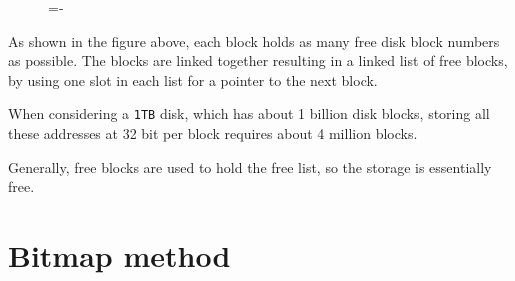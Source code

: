 \documentclass[a4paper]{systems-software}
\begin{document}
\begin{figure}[H]
  \lineskip=-\fboxrule
\end{figure}

As shown in the figure above, each block holds as many free disk block numbers as possible. The blocks are linked together resulting in a linked list of free blocks, by using one slot in each list for a pointer to the next block.

When considering a \texttt{1TB} disk, which has about 1 billion disk blocks, storing all these addresses at 32 bit per block requires about 4 million blocks.
 
 Generally, free blocks are used to hold the free list, so the storage is essentially free.


\newpage

\section*{Bitmap method}
\end{document}
